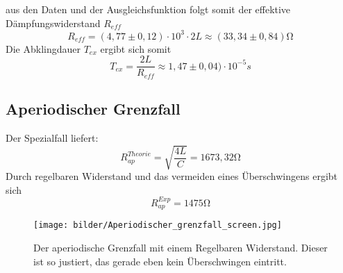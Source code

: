 aus den Daten und der Ausgleichsfunktion folgt somit der effektive Dämpfungswiderstand 
$R_{eff}$
\begin{equation}
    R_{eff}= (4,77 \pm 0,12)\cdot10^3 \cdot 2L \approx (33,34 \pm 0,84) \si{\ohm}
\end{equation}
Die Abklingdauer $T_{ex}$ ergibt sich somit
\begin{equation}
    T_{ex}=\frac{2L}{R_{eff}}\approx 1,47 \pm 0,04) \cdot 10^{-5}s
\end{equation}






\subsection{Aperiodischer Grenzfall}
Der Spezialfall liefert:
\begin{equation}
    R_{ap}^{Theorie}=\sqrt{\frac{4L}{C}}=1673,32\si{\ohm}     %
\end{equation}
Durch regelbaren Widerstand und das vermeiden eines Überschwingens ergibt sich
\begin{equation}
    R_{ap}^{Exp}=1475\si{\ohm}
\end{equation}
\begin{figure}
    \centering
    \texttt{[image: bilder/Aperiodischer\_grenzfall\_screen.jpg]}
    \caption{Der aperiodische Grenzfall mit einem Regelbaren Widerstand. Dieser ist so justiert, das gerade eben kein Überschwingen eintritt.}    %
\end{figure} 
\newpage







